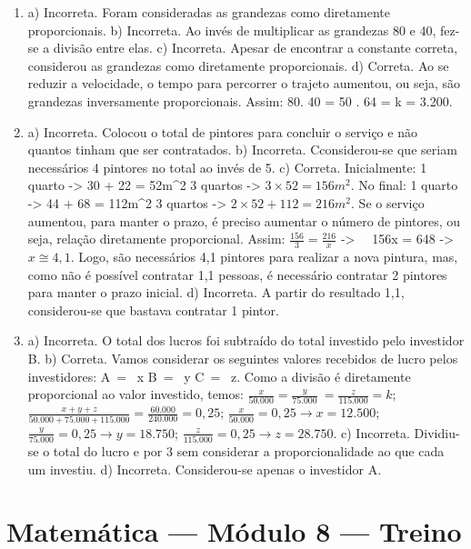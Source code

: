 \begin{enumerate}
\item a) Incorreta. Foram consideradas as grandezas como diretamente proporcionais.
b) Incorreta. Ao invés de multiplicar as grandezas 80 e 40, fez-se a divisão entre elas.
c) Incorreta. Apesar de encontrar a constante correta, considerou as grandezas como diretamente proporcionais.
d) Correta. Ao se reduzir a velocidade, o tempo para percorrer o trajeto aumentou, ou seja, são grandezas inversamente proporcionais.
Assim: 80. 40 = 50 . 64 = k = 3.200.


\item a) Incorreta. Colocou o total de pintores para concluir o serviço e não quantos tinham que ser contratados.
b) Incorreta. Cconsiderou-se que seriam necessários 4 pintores no total ao invés de 5.
c) Correta. Inicialmente: 1 quarto -> 30 + 22 = 52m^{2} 3 quartos
-> $3 \times 52 = 156m^{2}$. No final: 1 quarto -> 44 + 68 = 112m^{2} 3 quartos -> $2 \times 52 + 112 = 216m^{2}$. Se o serviço aumentou, para manter o prazo, é preciso aumentar o número de pintores, ou seja, relação diretamente proporcional. Assim: $\frac{156}{3} = \frac{216}{x}$  -> \ \ 156x = 648 -> $x \cong 4,1$. Logo, são necessários 4,1 pintores para realizar a nova pintura, mas, como não é possível contratar 1,1 pessoas, é necessário contratar 2
pintores para manter o prazo inicial.
d) Incorreta. A partir do resultado 1,1, considerou-se que bastava contratar 1 pintor.

\item a) Incorreta. O total dos lucros foi subtraído do total investido pelo investidor B.
b) Correta. Vamos considerar os seguintes valores recebidos de lucro pelos
investidores: A\  = \ x\; B\  = \ y C\  = \ z. Como a divisão é diretamente proporcional ao valor investido, temos: $\frac{x}{50.000} = \frac{y}{75.000}\  = \frac{z}{115.000} = k$; $\frac{x + y + z}{50.000 + 75.000 + 115.000} = \frac{60.000}{240.000} = 0,25$; $\frac{x}{50.000} = 0,25 \rightarrow x = 12.500$; $\frac{y}{75.000} = 0,25 \rightarrow y = 18.750$; $\frac{z}{115.000} = 0,25 \rightarrow z = 28.750$. 
c) Incorreta. Dividiu-se o total do lucro e  por 3 sem
considerar a proporcionalidade ao que cada um investiu.
d) Incorreta. Considerou-se apenas o investidor A.
\end{enumerate}

\section*{Matemática — Módulo 8 — Treino}

